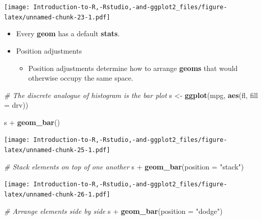 \documentclass[]{book}
\newenvironment{Shaded}{\begin{snugshade}}{\end{snugshade}}
\newcommand{\KeywordTok}[1]{\textcolor[rgb]{0.13,0.29,0.53}{\textbf{{#1}}}}
\newcommand{\DataTypeTok}[1]{\textcolor[rgb]{0.13,0.29,0.53}{{#1}}}
\newcommand{\StringTok}[1]{\textcolor[rgb]{0.31,0.60,0.02}{{#1}}}
\newcommand{\CommentTok}[1]{\textcolor[rgb]{0.56,0.35,0.01}{\textit{{#1}}}}
\newcommand{\NormalTok}[1]{{#1}}
\providecommand{\tightlist}{%
  \setlength{\itemsep}{0pt}\setlength{\parskip}{0pt}}
\begin{document}
\texttt{[image: Introduction-to-R,-Rstudio,-and-ggplot2\_files/figure-latex/unnamed-chunk-23-1.pdf]}

\begin{itemize}
\item
  Every \textbf{geom} has a default \textbf{stats}.
\item
  Position adjustments

  \begin{itemize}
  \tightlist
  \item
    Position adjustments determine how to arrange \textbf{geoms} that
    would otherwise occupy the same space.
  \end{itemize}
\end{itemize}

\begin{Shaded}
\begin{Highlighting}[]
\CommentTok{# The discrete analogue of histogram is the bar plot}
\NormalTok{s <-}\StringTok{ }\KeywordTok{ggplot}\NormalTok{(mpg, }\KeywordTok{aes}\NormalTok{(fl, }\DataTypeTok{fill =} \NormalTok{drv))}
\end{Highlighting}
\end{Shaded}

\begin{Shaded}
\begin{Highlighting}[]
\NormalTok{s +}\StringTok{ }\KeywordTok{geom_bar}\NormalTok{()}
\end{Highlighting}
\end{Shaded}

\texttt{[image: Introduction-to-R,-Rstudio,-and-ggplot2\_files/figure-latex/unnamed-chunk-25-1.pdf]}

\begin{Shaded}
\begin{Highlighting}[]
\CommentTok{# Stack elements on top of one another}
\NormalTok{s +}\StringTok{ }\KeywordTok{geom_bar}\NormalTok{(}\DataTypeTok{position =} \StringTok{"stack"}\NormalTok{)}
\end{Highlighting}
\end{Shaded}

\texttt{[image: Introduction-to-R,-Rstudio,-and-ggplot2\_files/figure-latex/unnamed-chunk-26-1.pdf]}

\begin{Shaded}
\begin{Highlighting}[]
\CommentTok{# Arrange elements side by side}
\NormalTok{s +}\StringTok{ }\KeywordTok{geom_bar}\NormalTok{(}\DataTypeTok{position =} \StringTok{"dodge"}\NormalTok{)}
\end{Highlighting}
\end{Shaded}
\end{document}

